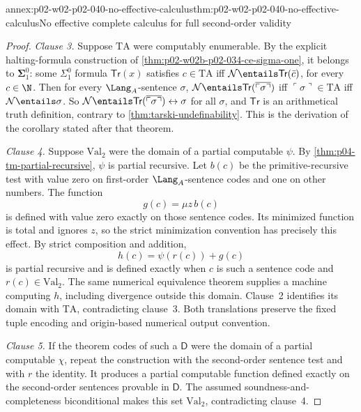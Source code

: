 \begin{annexitem}{annex:p02-w02-p02-040-no-effective-calculus}{thm:p02-w02-p02-040-no-effective-calculus}{No effective complete calculus for full second-order validity}
\begin{proof}
\emph{Clause 3.} Suppose \(\mathrm{TA}\) were computably enumerable.
By the explicit halting-formula construction of
\cref{thm:p02-w02b-p02-034-ce-sigma-one}, it belongs to
\(\boldsymbol\Sigma^0_1\): some
\(\Sigma^0_1\) formula \(\mathsf{Tr}(x)\) satisfies
\(c\in\mathrm{TA}\) iff \(\mathcal N\entails\mathsf{Tr}(\bar c)\), for every
\(c\in\N\).  Then for every \(\Lang_A\)-sentence \(\sigma\),
\(\mathcal N\entails\mathsf{Tr}(\overline{\ulcorner\sigma\urcorner})\) iff
\(\ulcorner\sigma\urcorner\in\mathrm{TA}\) iff \(\mathcal N\entails\sigma\).  So
\(\mathcal N\entails\mathsf{Tr}(\overline{\ulcorner\sigma\urcorner})\leftrightarrow\sigma\)
for all \(\sigma\), and \(\mathsf{Tr}\) is an arithmetical truth definition,
contrary to \cref{thm:tarski-undefinability}.  This is the derivation of the
corollary stated after that theorem.

\emph{Clause 4.} Suppose \(\mathrm{Val}_2\) were the domain of a
partial computable \(\psi\). By
\cref{thm:p04-tm-partial-recursive}, \(\psi\) is partial recursive.
Let \(b(c)\) be the primitive-recursive test with value zero on
first-order \(\Lang_A\)-sentence codes and one on other numbers.
The function
\[
 g(c)=\mu z\,b(c)
\]
is defined with value zero exactly on those sentence codes. Its
minimized function is total and ignores \(z\), so the strict
minimization convention has precisely this effect. By strict
composition and addition,
\[
 h(c)=\psi(r(c))+g(c)
\]
is partial recursive and is defined exactly when \(c\) is such a
sentence code and \(r(c)\in\mathrm{Val}_2\). The same numerical
equivalence theorem supplies a machine computing \(h\), including
divergence outside this domain. Clause~2 identifies its domain with
\(\mathrm{TA}\), contradicting clause~3. Both translations preserve the fixed tuple encoding and
origin-based numerical output convention.

\emph{Clause 5.} If the theorem codes of such a \(\mathsf D\)
were the domain of a partial computable \(\chi\), repeat the
construction with the second-order sentence test and with \(r\)
the identity. It produces a partial computable function defined
exactly on the second-order sentences provable in \(\mathsf D\).
The assumed soundness-and-completeness biconditional makes this
set \(\mathrm{Val}_2\), contradicting clause~4.
\end{proof}
\end{annexitem}

